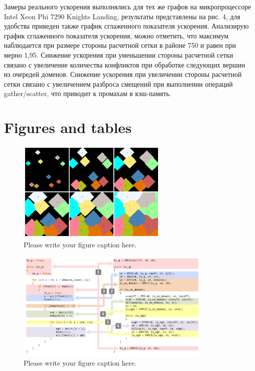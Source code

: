 \documentclass[
11pt,%
tightenlines,%
twoside,%
onecolumn,%
nofloats,%
nobibnotes,%
nofootinbib,%
superscriptaddress,%
noshowpacs,%
centertags]%
{revtex4}
\begin{document}
Замеры реального ускорения выполнялись для тех же графов на микропроцессоре Intel Xeon Phi 7290 Knights Landing, результаты представлены на рис. 4, для удобства приведен также график сглаженного показателя ускорения.
Анализирую график сглаженного показателя ускорения, можно отметить, что максимум наблюдается при размере стороны расчетной сетки в районе 750 и равен при мерно 1,95.
Снижение ускорения при уменьшении стороны расчетной сетки связано с увеличение количества конфликтов при обработке следующих вершин из очередей доменов.
Снижение ускорения при увеличении стороны расчетной сетки связано с увеличением разброса смещений при выполнении операций gather/scatter, что приводит к промахам в кэш-память.

\section{Figures and tables}

\begin{figure}[h]
\setcaptionmargin{5mm}
\onelinecaptionstrue  %
\includegraphics[width=0.65\textwidth]{pics/incr.pdf}
\caption{Please write your figure caption here.}\label{fig:incr}
\end{figure}

\begin{figure}[h]
\setcaptionmargin{5mm}
\onelinecaptionstrue  %
\includegraphics[width=0.85\textwidth]{pics/code.pdf}
\caption{Please write your figure caption here.}\label{fig:code}
\end{figure}
\end{document}
